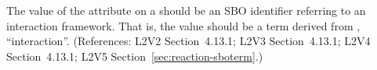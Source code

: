 The value of the  attribute on a \Reaction should
be an SBO identifier referring to an interaction framework.  That
is, the value should be a term derived from \sbointeractionID,
``interaction''.  (References: L2V2 Section~4.13.1; L2V3
Section~4.13.1; L2V4 Section~4.13.1; L2V5 Section~\ref{sec:reaction-sboterm}.)
